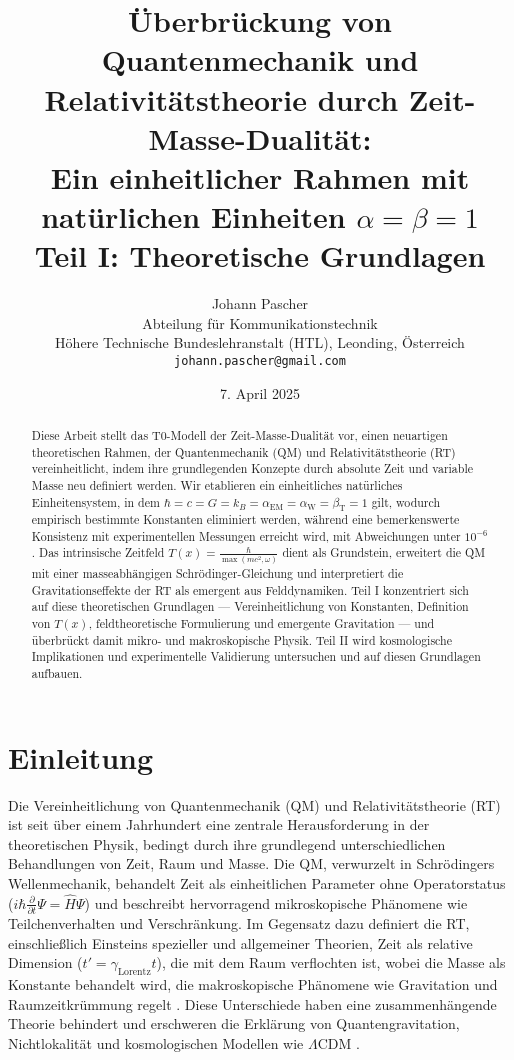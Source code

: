 \documentclass[12pt,a4paper]{article}
\title{Überbrückung von Quantenmechanik und Relativitätstheorie durch Zeit-Masse-Dualität: \\ Ein einheitlicher Rahmen mit natürlichen Einheiten \(\alpha = \beta = 1\) \\ Teil I: Theoretische Grundlagen}
\author{Johann Pascher\\
	Abteilung für Kommunikationstechnik\\
	Höhere Technische Bundeslehranstalt (HTL), Leonding, Österreich\\
	\texttt{johann.pascher@gmail.com}}
\date{7. April 2025}
\newcommand{\Tfield}{T(x)}
\newcommand{\alphaEM}{\alpha_{\text{EM}}}
\newcommand{\alphaW}{\alpha_{\text{W}}}
\newcommand{\betaT}{\beta_{\text{T}}}
\newcommand{\gammaf}{\gamma_{\text{Lorentz}}}
\begin{document}
	
	\maketitle
	
	\begin{abstract}
		Diese Arbeit stellt das T0-Modell der Zeit-Masse-Dualität vor, einen neuartigen theoretischen Rahmen, der Quantenmechanik (QM) und Relativitätstheorie (RT) vereinheitlicht, indem ihre grundlegenden Konzepte durch absolute Zeit und variable Masse neu definiert werden. Wir etablieren ein einheitliches natürliches Einheitensystem, in dem \(\hbar = c = G = k_B = \alphaEM = \alphaW = \betaT = 1\) gilt, wodurch empirisch bestimmte Konstanten eliminiert werden, während eine bemerkenswerte Konsistenz mit experimentellen Messungen erreicht wird, mit Abweichungen unter \(10^{-6}\). Das intrinsische Zeitfeld \(\Tfield = \frac{\hbar}{\max(mc^2, \omega)}\) dient als Grundstein, erweitert die QM mit einer masseabhängigen Schrödinger-Gleichung und interpretiert die Gravitationseffekte der RT als emergent aus Felddynamiken. Teil I konzentriert sich auf diese theoretischen Grundlagen — Vereinheitlichung von Konstanten, Definition von \(\Tfield\), feldtheoretische Formulierung und emergente Gravitation — und überbrückt damit mikro- und makroskopische Physik. Teil II wird kosmologische Implikationen und experimentelle Validierung untersuchen und auf diesen Grundlagen aufbauen.
	\end{abstract}
	\newpage
	\tableofcontents
	\newpage
	\section{Einleitung}
	\label{sec:introduction}
	
	Die Vereinheitlichung von Quantenmechanik (QM) und Relativitätstheorie (RT) ist seit über einem Jahrhundert eine zentrale Herausforderung in der theoretischen Physik, bedingt durch ihre grundlegend unterschiedlichen Behandlungen von Zeit, Raum und Masse. Die QM, verwurzelt in Schrödingers Wellenmechanik, behandelt Zeit als einheitlichen Parameter ohne Operatorstatus (\(i\hbar \frac{\partial}{\partial t}\Psi = \hat{H}\Psi\)) \cite{schrodinger1926} und beschreibt hervorragend mikroskopische Phänomene wie Teilchenverhalten und Verschränkung. Im Gegensatz dazu definiert die RT, einschließlich Einsteins spezieller und allgemeiner Theorien, Zeit als relative Dimension (\(t' = \gammaf t\)), die mit dem Raum verflochten ist, wobei die Masse als Konstante behandelt wird, die makroskopische Phänomene wie Gravitation und Raumzeitkrümmung regelt \cite{einstein1905,einstein1915}. Diese Unterschiede haben eine zusammenhängende Theorie behindert und erschweren die Erklärung von Quantengravitation, Nichtlokalität \cite{bell1964} und kosmologischen Modellen wie \(\Lambda\)CDM \cite{Planck2020}.
	
\end{document}
